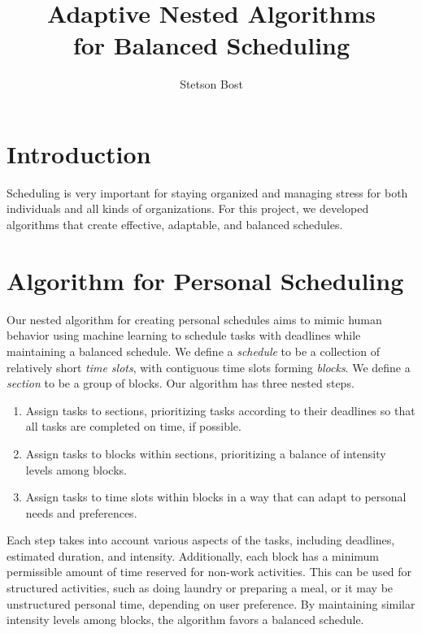 \documentclass[thesis]{hmcposter}
\author{Stetson Bost}
\title{Adaptive Nested Algorithms\\for Balanced Scheduling}
\begin{document}
\begin{poster}

\section{Introduction}
Scheduling is very important for staying organized and managing stress for both individuals and all kinds of organizations.
For this project, we developed algorithms that create effective, adaptable, and balanced schedules.

\section{Algorithm for Personal Scheduling}
Our nested algorithm for creating personal schedules aims to mimic human behavior using machine learning to schedule tasks with deadlines while maintaining a balanced schedule.
We define a \emph{schedule} to be a collection of relatively short \emph{time slots}, with contiguous time slots forming \emph{blocks}.
We define a \emph{section} to be a group of blocks.
Our algorithm has three nested steps.
\begin{enumerate}
	\item
		Assign tasks to sections, prioritizing tasks according to their deadlines so that all tasks are completed on time, if possible.
	\item
		Assign tasks to blocks within sections, prioritizing a balance of intensity levels among blocks.
	\item
		Assign tasks to time slots within blocks in a way that can adapt to personal needs and preferences.
\end{enumerate}
Each step takes into account various aspects of the tasks, including deadlines, estimated duration, and intensity. Additionally, each block has a minimum permissible amount of time reserved for non-work activities. This can be used for structured activities, such as doing laundry or preparing a meal, or it may be unstructured personal time, depending on user preference.
By maintaining similar intensity levels among blocks, the algorithm favors a balanced schedule.


\end{poster}
\end{document}
